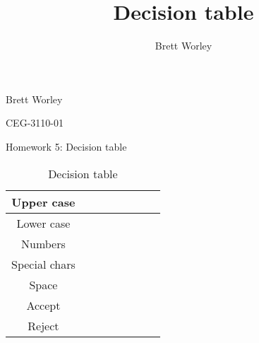 \documentclass[12pt,letterpaper]{article}
\author{Brett Worley}
\title{Decision table}
\begin{document}
Brett Worley

CEG-3110-01

\centerline{ Homework 5: Decision table}

\begin{table}[h]
  \begin{center}
    \caption{Decision table}
    \label{tab:Main table}
    
    \begin{tabular}{c|c|c|c|c|c|c|c}
    Upper case & & & & & & & \\
    \hline
    Lower case & & & & & & & \\
    \hline
    Numbers & & & & & & & \\
    \hline
    Special chars & & & & & & & \\
    \hline
    Space & & & & & & & \\
    \midrule
    Accept & & & & & & & \\
    \hline
    Reject & & & & & & & \\
    \end{tabular}
  \end{center}
\end{table}
\end{document}
